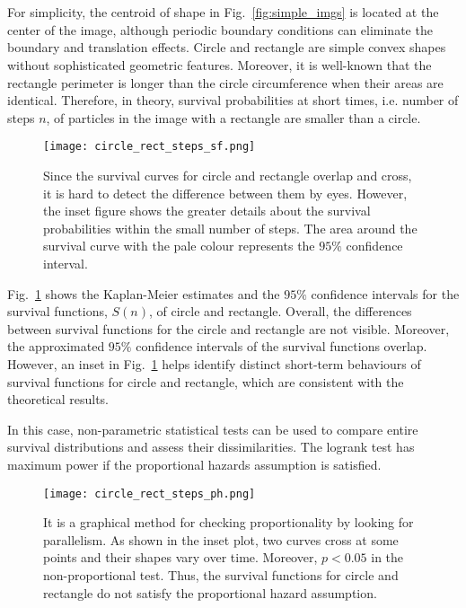 


\section{}


For simplicity, the centroid of shape in Fig.~\ref{fig:simple_imgs} is
located at the center of the image, although periodic boundary
conditions can eliminate the boundary and translation effects. Circle
and rectangle are simple convex shapes without sophisticated geometric
features. Moreover, it is well-known that the rectangle perimeter is
longer than the circle circumference when their areas are
identical. Therefore, in theory, survival probabilities at short
times, i.e. number of steps $n$, of particles in the image with a
rectangle are smaller than a circle.


    \begin{figure}
      \centering
      \texttt{[image: circle\_rect\_steps\_sf.png]}
      \caption{Since the survival curves for circle and rectangle overlap and cross, it is hard to detect the difference between them by eyes. However, the inset figure shows the greater details about the survival probabilities within the small number of steps. The area around the survival curve with the pale colour represents the $95\%$ confidence interval.}
      \label{fig:sf_simple_shape_steps}
    \end{figure}
     
Fig.~\ref{fig:sf_simple_shape_steps} shows the Kaplan-Meier estimates
and the $95\%$ confidence intervals for the survival functions,
$S(n)$, of circle and rectangle. Overall, the differences between
survival functions for the circle and rectangle are not
visible. Moreover, the approximated $95\%$ confidence intervals of the
survival functions overlap. However, an inset in
Fig.~\ref{fig:sf_simple_shape_steps} helps identify distinct
short-term behaviours of survival functions for circle and rectangle,
which are consistent with the theoretical results.





In this case, non-parametric statistical tests can be used to compare
entire survival distributions and assess their dissimilarities. The
logrank test has maximum power if the proportional hazards assumption
is satisfied.

   \begin{figure}
     \centering
     \texttt{[image: circle\_rect\_steps\_ph.png]}
     \label{fig:ph_test_simple_shapes}
     \caption{It is a graphical method for checking proportionality by looking for parallelism. As shown in the inset plot, two curves cross at some points and their shapes vary over time. Moreover, $p < 0.05$ in the non-proportional test. Thus, the survival functions for circle and rectangle do not satisfy the proportional hazard assumption.}
   \end{figure}


